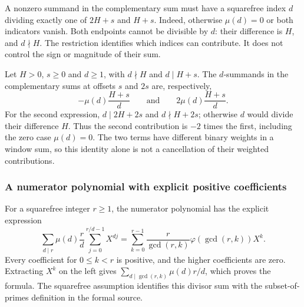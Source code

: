 \begin{obs}
A nonzero summand in the complementary sum must have a squarefree
index $d$ dividing exactly one of $2H+s$ and $H+s$. Indeed, otherwise
$\mu(d)=0$ or both indicators vanish. Both endpoints cannot be divisible
by $d$: their difference is $H$, and $d\nmid H$.
\quad {}
The restriction identifies which indices can contribute. It does not
control the sign or magnitude of their sum.
\end{obs}

\begin{prop}\label{prop:doubling-identity-two-portions-sum}
Let $H>0$, $s\ge0$ and $d\ge1$, with $d\nmid H$ and $d\mid H+s$.
The $d$-summands in the complementary sums at offsets $s$ and $2s$ are,
respectively,
\[
 -\mu(d)\frac{H+s}{d}
 \qquad\text{and}\qquad
 2\mu(d)\frac{H+s}{d}.
\]
For the second expression, $d\mid2H+2s$ and $d\nmid H+2s$; otherwise
$d$ would divide their difference $H$. Thus the second contribution is
$-2$ times the first, including the zero case $\mu(d)=0$. The two
terms have different binary weights in a window sum, so this identity
alone is not a cancellation of their weighted contributions.
\end{prop}

\subsubsection{A numerator polynomial with explicit positive coefficients}
\label{repunit-gcd-word}

\begin{thm}\label{thm:positive-coefficients-numerator-polynomial}
For a squarefree integer $r\ge1$, the numerator polynomial has the
explicit expression
\[
 \sum_{d\mid r}\mu(d)\frac rd\sum_{j=0}^{r/d-1}X^{dj}
   =\sum_{k=0}^{r-1}
        \frac r{\gcd(r,k)}\varphi(\gcd(r,k))X^k.
\]
Every coefficient for $0\le k<r$ is positive, and the higher coefficients
are zero. Extracting $X^k$ on the left gives
$\sum_{d\mid\gcd(r,k)}\mu(d)r/d$, which proves the formula.
The squarefree assumption identifies this divisor sum with the
subset-of-primes definition in the formal source.
\end{thm}

